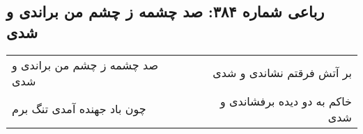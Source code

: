 \begin{center}
\section*{رباعی شماره ۳۸۴: صد چشمه ز چشم من براندی و شدی}
\label{sec:sh384}
\begin{longtable}{l p{0.5cm} r}
صد چشمه ز چشم من براندی و شدی
&&
بر آتش فرقتم نشاندی و شدی
\\
چون باد جهنده آمدی تنگ برم
&&
خاکم به دو دیده برفشاندی و شدی
\\
\end{longtable}
\end{center}
